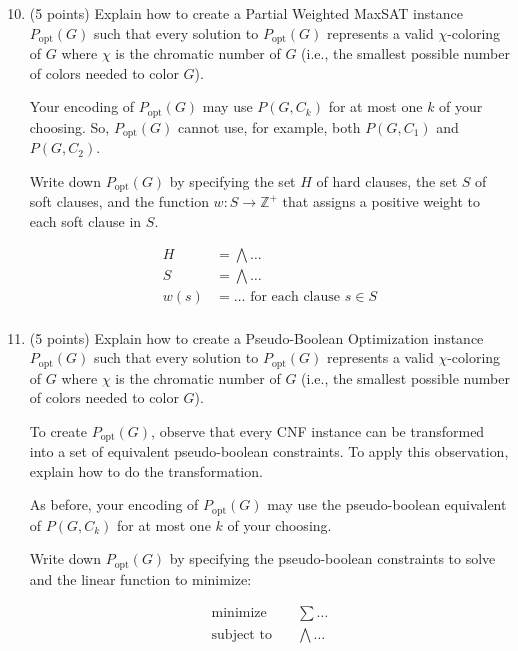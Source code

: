 \documentclass{article}
\begin{document}
\begin{enumerate}
	\setcounter{enumi}{9}
	
	\item (5 points) Explain how to create a Partial Weighted MaxSAT instance $P_{\text{opt}}(G)$ 
	such that every solution to $P_{\text{opt}}(G)$ represents a valid $\chi$-coloring of $G$ where $\chi$ is 
	the chromatic number of $G$ (i.e., the smallest possible number of colors needed to color $G$). 
	
	Your encoding of  $P_{\text{opt}}(G)$ may use $P(G, C_k)$ for at most one $k$ of your choosing.  
	So, $P_{\text{opt}}(G)$ cannot use, for example, both $P(G, C_1)$ and $P(G, C_2)$.
	
	Write down  $P_{\text{opt}}(G)$ by specifying the set $H$ of hard clauses, 
	the set $S$ of soft clauses, and the function $w : S \rightarrow \mathbb{Z^+}$ that assigns a positive weight to each soft clause in $S$. 
	
	\begin{align*}
	H    	&=     \bigwedge \ldots \\
	S    	&=     \bigwedge \ldots \\
	w(s)    	&=    \ldots \text{ for each clause } s  \in S\\ 
	\end{align*} 
	
	
	
	\item (5 points)  Explain how to create a Pseudo-Boolean Optimization instance $P_{\text{opt}}(G)$ 
	such that every solution to $P_{\text{opt}}(G)$ represents a valid $\chi$-coloring of $G$ where $\chi$ is 
	the chromatic number of $G$ (i.e., the smallest possible number of colors needed to color $G$). 
	
	To create $P_{\text{opt}}(G)$, observe that every CNF instance  
	can be transformed into a set of equivalent pseudo-boolean constraints.  
	To apply this observation, explain how to do the transformation. 
	
	As before, your encoding of  $P_{\text{opt}}(G)$ may use the  pseudo-boolean equivalent of  $P(G, C_k)$ for at most one $k$ of your choosing.  
	
	
	Write down  $P_{\text{opt}}(G)$ by specifying the pseudo-boolean constraints to solve and the linear function to minimize: 
	
	\begin{align*}
	\text{minimize}  	 \quad& \sum \ldots \\
	\text{subject to}    	\quad&  \bigwedge \ldots \\
	\end{align*} 
	
	
	
	
\end{enumerate}
\end{document}
